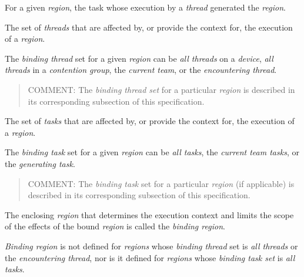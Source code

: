 \glossarydefstart
For a given \emph{region}, the task whose execution by a \emph{thread} generated the \emph{region}.
\glossarydefend

\glossarydefstart
The set of \emph{threads} that are affected by, or provide the context for, the execution of 
a \emph{region}. 

The \emph{binding thread} set for a given \emph{region} can be \emph{all threads} on a \emph{device}, \emph{all 
threads} in a \emph{contention group}, the \emph{current team}, or the \emph{encountering thread}.

\begin{quote}
COMMENT: The \emph{binding thread set} for a particular \emph{region} is described in its 
corresponding subsection of this specification.
\end{quote}
\glossarydefend

\glossarydefstart
The set of \emph{tasks} that are affected by, or provide the context for, the execution of a 
\emph{region}. 

The \emph{binding task} set for a given \emph{region} can be \emph{all tasks}, 
the \emph{current team tasks}, or the \emph{generating task}. 

\begin{quote}
COMMENT: The \emph{binding task} set for a particular \emph{region} (if applicable) is 
described in its corresponding subsection of this specification.
\end{quote}
\glossarydefend

\pagebreak
{}
\glossarydefstart
The enclosing \emph{region} that determines the execution context and limits the scope of 
the effects of the bound \emph{region} is called the \emph{binding region}.

\emph{Binding region} is not defined for \emph{regions} whose \emph{binding thread} set is \emph{all threads}
or the \emph{encountering thread}, nor is it defined for \emph{regions} whose \emph{binding task set} is 
\emph{all tasks}.

